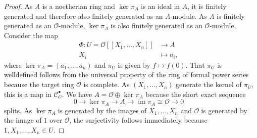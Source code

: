 \documentclass{article}
\theoremstyle{plain}%
\theoremstyle{definition}
\theoremstyle{remark}
\newcommand{\cob}{\mathcal{C}_\mathcal{O}^\bullet}
\newcommand{\im}{\operatorname{im}}
\begin{document}
\begin{proof}
    As \(A\) is a noetherian ring and \(\ker \pi_A\) is an ideal in \(A\), it is finitely generated 
    and therefore also finitely generated as an \(A\)-module.
    As \(A\) is finitely generated as an \(\mathcal{O}\)-module, \(\ker \pi_A\) is also
    finitely generated as an \(\mathcal{O}\)-module. Consider the map
    \begin{align*}
        \Phi\colon U = \mathcal{O}[[X_1, \dots, X_n]] &\to A\\
        X_i &\mapsto a_i,
    \end{align*}
    where \(\ker \pi_A = (a_1, \dots, a_n)\) and \(\pi_U\) is given by \(f \mapsto f(0)\).
    That \(\pi_U\) is welldefined follows from the universal property of the ring of formal power series
    because the target ring \(\mathcal{O}\) is complete.
    As \((X_1, \dots, X_n)\) generate the kernel of \(\pi_U\), this is a map in \(\cob\).
    We have \(A = \mathcal{O} \oplus \ker \pi_A\) because the short exact sequence
    \[
        0 \to \ker \pi_A \to A \to \im \pi_A \cong \mathcal{O} \to 0
    \]
    splits.
    As \(\ker \pi_A\) is generated by the images of \(X_1, \dots, X_n\)
    and \(\mathcal{O}\) is generated by the image of \(1\) over \(\mathcal{O}\), the surjectivity follows immediately
    because \(1, X_1, \dots, X_n \in U\).
\end{proof}
\end{document}
